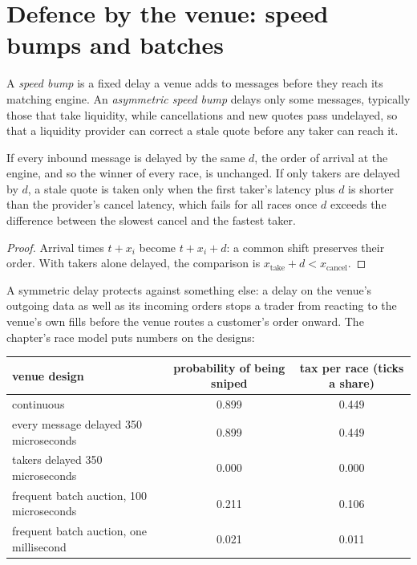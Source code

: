 \section{Defence by the venue: speed bumps and batches}

\begin{definition}\label{def:hf:latency-arbitrage-and-its-defence:bump}
A \emph{speed bump} is a fixed delay a venue adds to messages before they reach its matching engine. An \emph{asymmetric speed
bump} delays only some messages, typically those that take liquidity, while cancellations and new quotes pass
undelayed, so that a liquidity provider can correct a stale quote before any taker can reach it.
\end{definition}

\begin{proposition}\label{prop:hf:latency-arbitrage-and-its-defence:bump}
If every inbound message is delayed by the same $d$, the order of arrival at the engine, and so the winner of every race, is unchanged. If only
takers are delayed by $d$, a stale quote is taken only when the first taker's latency plus $d$ is shorter than the provider's cancel latency, which
fails for all races once $d$ exceeds the difference between the slowest cancel and the fastest taker.
\end{proposition}

\begin{proof}
Arrival times $t+x_i$ become $t+x_i+d$: a common shift preserves their order. With takers alone delayed, the comparison is $x_{\text{take}}+d<x_{\text{cancel}}$.
\end{proof}

A symmetric delay protects against something else: a delay on the venue's outgoing data as well as its incoming orders stops a trader from
reacting to the venue's own fills before the venue routes a customer's order onward. The chapter's race model puts numbers on the designs:

\begin{center}
\small
\begin{tabular}{@{}lcc@{}}
\toprule
venue design & probability of being sniped & tax per race (ticks a share)\\
\midrule
continuous & 0.899 & 0.449\\
every message delayed 350 microseconds & 0.899 & 0.449\\
takers delayed 350 microseconds & 0.000 & 0.000\\
frequent batch auction, 100 microseconds & 0.211 & 0.106\\
frequent batch auction, one millisecond & 0.021 & 0.011\\
\bottomrule
\end{tabular}
\end{center}

